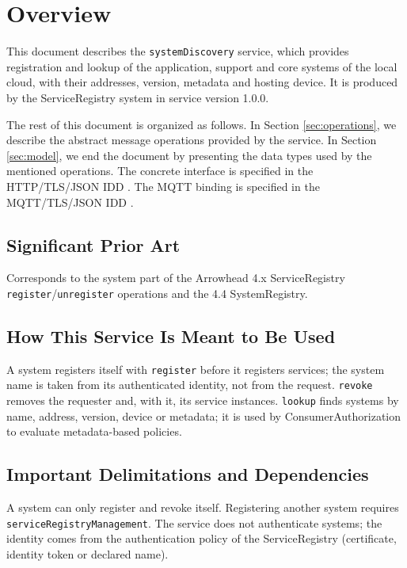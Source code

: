 \documentclass[a4paper]{arrowhead}
\begin{document}
\section{Overview}
\label{sec:overview}

This document describes the \texttt{systemDiscovery} service, which provides registration and lookup of the application, support and core systems of the local cloud, with their addresses, version, metadata and hosting device.
It is produced by the ServiceRegistry system \cite{sr-sysd} in service version 1.0.0.

The rest of this document is organized as follows.
In Section \ref{sec:operations}, we describe the abstract message operations provided by the service.
In Section \ref{sec:model}, we end the document by presenting the data types used by the mentioned operations.
The concrete interface is specified in the HTTP/TLS/JSON IDD \cite{sr-systemDiscovery-http-idd}. The MQTT binding is specified in the MQTT/TLS/JSON IDD \cite{sr-systemDiscovery-mqtt-idd}.

\subsection{Significant Prior Art}

Corresponds to the system part of the Arrowhead 4.x ServiceRegistry \texttt{register}/\texttt{unregister} operations and the 4.4 SystemRegistry.

\subsection{How This Service Is Meant to Be Used}

A system registers itself with \texttt{register} before it registers services; the system name is taken from its authenticated identity, not from the request. \texttt{revoke} removes the requester and, with it, its service instances. \texttt{lookup} finds systems by name, address, version, device or metadata; it is used by Consumer\allowbreak{}Authorization to evaluate metadata-based policies.

\subsection{Important Delimitations and Dependencies}
\label{sec:delimitations}

A system can only register and revoke itself. Registering another system requires \texttt{service\allowbreak{}Registry\allowbreak{}Management}. The service does not authenticate systems; the identity comes from the authentication policy of the ServiceRegistry (certificate, identity token or declared name).
\end{document}
